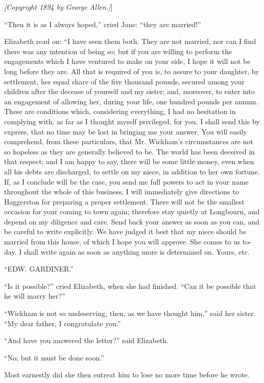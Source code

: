 \documentclass[12pt]{book}
\begin{document}
\emph{[\textit{Copyright 1894 by George Allen.}]}]

``Then it is as I always hoped,'' cried Jane: ``they are married!''

Elizabeth read on: ``I have seen them both. They are not married, nor can I find there was any intention of being so; but if you are willing to perform the engagements which I have ventured to make on your side, I hope it will not be long before they are. All that is required of you is, to assure to your daughter, by settlement, her equal share of the five thousand pounds, secured among your children after the decease of yourself and my sister; and, moreover, to enter into an engagement of allowing her, during your life, one hundred pounds per annum. These are conditions which, considering everything, I had no hesitation in complying with, as far as I thought myself privileged, for you. I shall send this by express, that no time may be lost in bringing me your answer. You will easily comprehend, from these particulars, that Mr. Wickham's circumstances are not so hopeless as they are generally believed to be. The world has been deceived in that respect; and I am happy to say, there will be some little money, even when all his debts are discharged, to settle on my niece, in addition to her own fortune. If, as I conclude will be the case, you send me full powers to act in your name throughout the whole of this business, I will immediately give directions to Haggerston for preparing a proper settlement. There will not be the smallest occasion for your coming to town again; therefore stay quietly at Longbourn, and depend on my diligence and care. Send back your answer as soon as you can, and be careful to write explicitly. We have judged it best that my niece should be married from this house, of which I hope you will approve. She comes to us to-day. I shall write again as soon as anything more is determined on. Yours, etc.

``EDW. GARDINER.''

``Is it possible?'' cried Elizabeth, when she had finished. ``Can it be possible that he will marry her?''

``Wickham is not so undeserving, then, as we have thought him,'' said her sister. ``My dear father, I congratulate you.''

``And have you answered the letter?'' said Elizabeth.

``No; but it must be done soon.''

Most earnestly did she then entreat him to lose no more time before he wrote.
\end{document}
